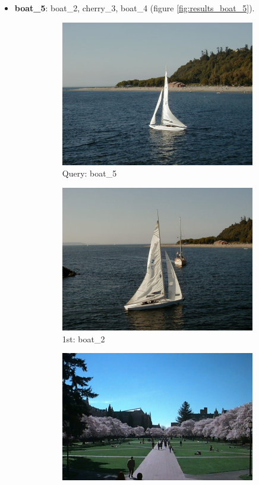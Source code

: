 \documentclass[10pt, a4paper]{article}
\begin{document}
\begin{itemize}
\item \textbf{boat\_5}: boat\_2, cherry\_3, boat\_4 (figure \ref{fig:results_boat_5}).
\begin{figure}[H]
	\centering
	\begin{subfigure}{0.25\textwidth}
	  \centering
	  \includegraphics[width=0.9\linewidth]{../input/boat_5.jpg}
	  \caption{Query: boat\_5}
	\end{subfigure}%
	\begin{subfigure}{0.25\textwidth}
	  \centering
	  \includegraphics[width=0.9\linewidth]{../input/boat_2.jpg}
	  \caption{1st: boat\_2}
	\end{subfigure}%
	\begin{subfigure}{0.25\textwidth}
        \centering
        \includegraphics[width=0.9\linewidth]{../input/cherry_3.jpg}

\end{subfigure}
\end{figure}
\end{itemize}
\end{document}
